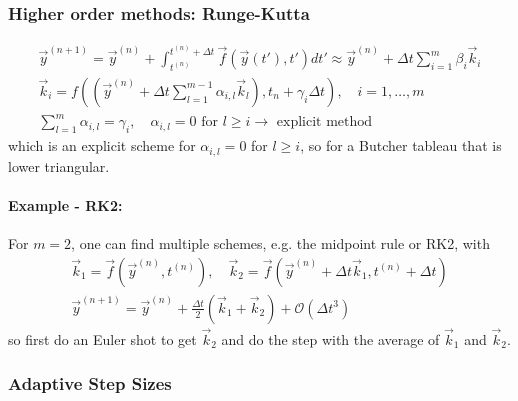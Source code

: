 \subsubsection*{Higher order methods: Runge-Kutta}
\begin{equation}
    \begin{gathered}
    \vec{y}^{(n+1)}= \vec{y}^{(n)} + \int_{t^{(n)}}^{t^{(n)} + \Delta t} \vec{f}(\vec{y}(t'),t') dt' \approx \vec{y}^{(n)}+\Delta t \sum_{i=1}^m \beta_i \vec{k}_i \\
    \vec{k}_i=f\left(\left(\vec{y}^{(n)}+\Delta t \sum_{l=1}^{m-1} \alpha_{i, l} \vec{k}_l\right), t_n+\gamma_i \Delta t\right), \quad i=1, \ldots, m \\
    \sum_{l=1}^m \alpha_{i, l}=\gamma_i, \quad \alpha_{i, l}=0 \text { for } l \geq i \rightarrow \text { explicit method }
    \end{gathered}
\end{equation}
which is an explicit scheme for $\alpha_{i, l} = 0$ for $l \geq i$, so for a Butcher tableau that is lower triangular.
\paragraph*{Example - RK2:} For $m = 2$, one can find multiple schemes, e.g. the midpoint rule or RK2, with
\begin{equation}
    \begin{gathered}
        \vec{k}_1 = \vec{f}(\vec{y}^{(n)}, t^{(n)}), \quad \vec{k}_2 = \vec{f}(\vec{y}^{(n)} + \Delta t \vec{k}_1, t^{(n)} + \Delta t) \\
        \vec{y}^{(n+1)} = \vec{y}^{(n)} + \frac{\Delta t}{2} \left( \vec{k}_1 + \vec{k}_2 \right) + \mathcal{O}(\Delta t^3)
    \end{gathered}
\end{equation}
so first do an Euler shot to get $\vec{k}_2$ and do the step with the average of $\vec{k}_1$ and $\vec{k}_2$.

\subsubsection*{Adaptive Step Sizes}

